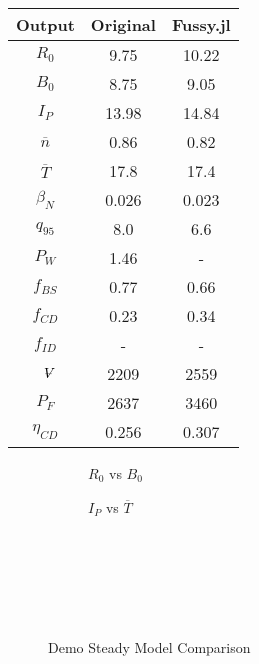 \begin{table}[h!]
\begin{subtable}[t]{0.5\textwidth}
\begin{tabular}{ c|c|c }
Output           & Original         & Fussy.jl        \\
\hline
$R_{0}$          & 9.75             & 10.22           \\
$B_{0}$          & 8.75             & 9.05           \\
$I_{P}$          & 13.98            & 14.84           \\
$\overline n$    & 0.86             & 0.82          \\
$\overline T$    & 17.8             & 17.4           \\
$\beta_{N}$       & 0.026            & 0.023          \\
$q_{95}$         & 8.0              & 6.6           \\
$P_{W}$          & 1.46             & -            \\
$f_{BS}$         & 0.77             & 0.66           \\
$f_{CD}$         & 0.23             & 0.34           \\
$f_{ID}$         & -              & -             \\
$\volume$         & 2209           & 2559          \\
$P_{F}$          & 2637           & 3460          \\
$\eta_{CD}$      & 0.256            & 0.307           \\

\end{tabular}
\end{subtable}
\hfill
\hfill
\label{table:act_2}
\end{table}

\clearpage

\newpage

\begin{figure*}[h!]
    \centering
    \hfill 
    \begin{subfigure}[t]{0.45\textwidth}
        \centering
    \begin{adjustbox}{width=\textwidth}
      \Large
      
    \end{adjustbox}
        \caption{$R_0$ vs $B_0$}
    \end{subfigure}
    \hfill
    \begin{subfigure}[t]{0.45\textwidth}
        \centering
    \begin{adjustbox}{width=\textwidth}
      \Large
      
    \end{adjustbox}
        \caption{$I_P$ vs $\overline T$}
    \end{subfigure}
    \hfill \hfill ~\\ ~\\ ~\\
    \caption{Demo Steady Model Comparison} ~\\
    \label{fig:demo_steady_comparison}
\end{figure*}

